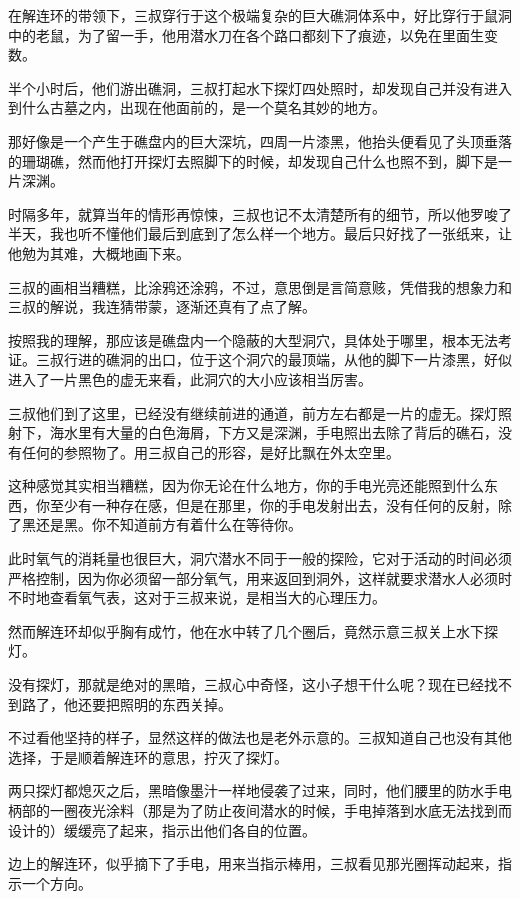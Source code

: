 在解连环的带领下，三叔穿行于这个极端复杂的巨大礁洞体系中，好比穿行于鼠洞中的老鼠，为了留一手，他用潜水刀在各个路口都刻下了痕迹，以免在里面生变数。

半个小时后，他们游出礁洞，三叔打起水下探灯四处照时，却发现自己并没有进入到什么古墓之内，出现在他面前的，是一个莫名其妙的地方。

那好像是一个产生于礁盘内的巨大深坑，四周一片漆黑，他抬头便看见了头顶垂落的珊瑚礁，然而他打开探灯去照脚下的时候，却发现自己什么也照不到，脚下是一片深渊。

时隔多年，就算当年的情形再惊悚，三叔也记不太清楚所有的细节，所以他罗唆了半天，我也听不懂他们最后到底到了怎么样一个地方。最后只好找了一张纸来，让他勉为其难，大概地画下来。

三叔的画相当糟糕，比涂鸦还涂鸦，不过，意思倒是言简意赅，凭借我的想象力和三叔的解说，我连猜带蒙，逐渐还真有了点了解。

按照我的理解，那应该是礁盘内一个隐蔽的大型洞穴，具体处于哪里，根本无法考证。三叔行进的礁洞的出口，位于这个洞穴的最顶端，从他的脚下一片漆黑，好似进入了一片黑色的虚无来看，此洞穴的大小应该相当厉害。

三叔他们到了这里，已经没有继续前进的通道，前方左右都是一片的虚无。探灯照射下，海水里有大量的白色海屑，下方又是深渊，手电照出去除了背后的礁石，没有任何的参照物了。用三叔自己的形容，是好比飘在外太空里。

这种感觉其实相当糟糕，因为你无论在什么地方，你的手电光亮还能照到什么东西，你至少有一种存在感，但是在那里，你的手电发射出去，没有任何的反射，除了黑还是黑。你不知道前方有着什么在等待你。

此时氧气的消耗量也很巨大，洞穴潜水不同于一般的探险，它对于活动的时间必须严格控制，因为你必须留一部分氧气，用来返回到洞外，这样就要求潜水人必须时不时地查看氧气表，这对于三叔来说，是相当大的心理压力。

然而解连环却似乎胸有成竹，他在水中转了几个圈后，竟然示意三叔关上水下探灯。

没有探灯，那就是绝对的黑暗，三叔心中奇怪，这小子想干什么呢？现在已经找不到路了，他还要把照明的东西关掉。

不过看他坚持的样子，显然这样的做法也是老外示意的。三叔知道自己也没有其他选择，于是顺着解连环的意思，拧灭了探灯。

两只探灯都熄灭之后，黑暗像墨汁一样地侵袭了过来，同时，他们腰里的防水手电柄部的一圈夜光涂料（那是为了防止夜间潜水的时候，手电掉落到水底无法找到而设计的）缓缓亮了起来，指示出他们各自的位置。

边上的解连环，似乎摘下了手电，用来当指示棒用，三叔看见那光圈挥动起来，指示一个方向。

